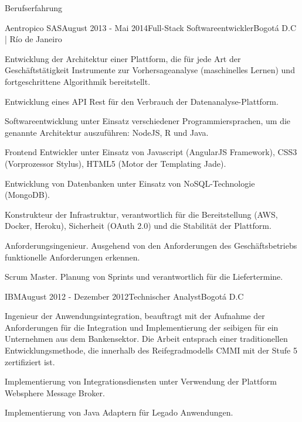 \documentclass[spanish]{resume} %
\begin{document}
\begin{rSection}{Berufserfahrung}

\begin{rSubsection}{Aentropico SAS}{August 2013 - Mai 2014}{Full-Stack Softwareentwickler}{Bogot\'a D.C | R\'io de Janeiro}
\item Entwicklung der Architektur einer Plattform, die für jede Art der Gesch{\"a}ftst{\"a}tigkeit Instrumente zur Vorhersageanalyse (maschinelles Lernen) und fortgeschrittene Algorithmik bereitstellt.
\item Entwicklung eines API Rest für den Verbrauch der Datenanalyse-Plattform.
\item Softwareentwicklung unter Einsatz verschiedener Programmiersprachen, um die genannte Architektur auszuf{\"u}hren: NodeJS, R und Java.
\item Frontend Entwickler unter Einsatz von Javascript (AngularJS Framework), CSS3 (Vorprozessor Stylus), HTML5 (Motor der Templating Jade).
\item Entwicklung von Datenbanken unter Einsatz von NoSQL-Technologie (MongoDB).
\item Konstrukteur der Infrastruktur, verantwortlich f{\"u}r die Bereitstellung (AWS, Docker, Heroku), Sicherheit (OAuth 2.0) und die Stabilit{\"a}t der Plattform.
\item Anforderungsingenieur. Ausgehend von den Anforderungen des Geschäftsbetriebs funktionelle Anforderungen erkennen.
\item Scrum Master. Planung von Sprints und verantwortlich f{\"u}r die Liefertermine.
\end{rSubsection}


\begin{rSubsection}{IBM}{August 2012 - Dezember 2012}{Technischer Analyst}{Bogot\'a D.C}
\item Ingenieur der Anwendungsintegration, beauftragt mit der Aufnahme der Anforderungen für die Integration und Implementierung der seibigen für ein Unternehmen aus dem Bankensektor. Die Arbeit entsprach einer traditionellen Entwicklungsmethode, die innerhalb des Reifegradmodells CMMI mit der Stufe 5 zertifiziert ist.
\item Implementierung von Integrationsdiensten unter Verwendung der Plattform Websphere Message Broker.
\item Implementierung von Java Adaptern für Legado Anwendungen.
\end{rSubsection}


\end{rSection}
\end{document}
